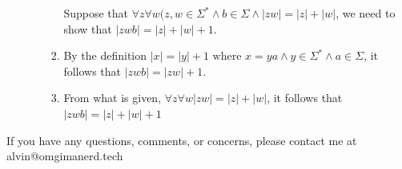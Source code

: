 \documentclass[letterpaper, 12pt]{math}
\begin{document}
\begin{enumerate}
\begin{enumerate}
\begin{enumerate}
      Suppose that \( \forall{z}\forall{w}(z,w\in\Sigma^*\wedge
      b\in\Sigma\wedge|zw| = |z|+|w| \), we need to show that \( |zwb| =
      |z|+|w|+1 \).
      \item By the definition \( |x| = |y|+1 \text{ where } x=ya\wedge y\in
      \Sigma^*\wedge a\in\Sigma\), it follows that \( |zwb| = |zw| + 1 \).
      \item From what is given, \( \forall{z}\forall{w}|zw| = |z|+|w| \), it
      follows that \( |zwb| = |z|+|w|+1 \)
    \end{enumerate}
  \end{enumerate}
\end{enumerate}

\begin{center}
  If you have any questions, comments, or concerns, please contact me at
  alvin@omgimanerd.tech
\end{center}
\end{document}
